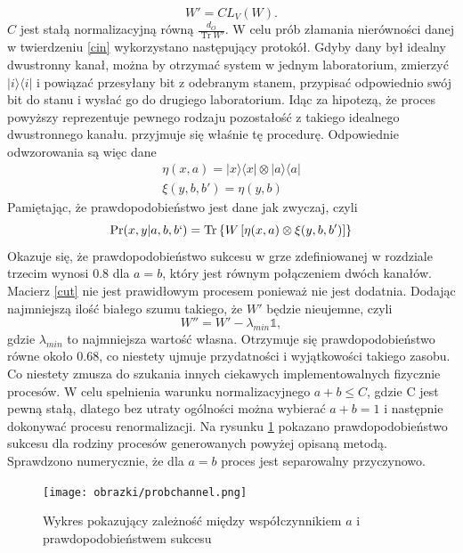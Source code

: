 \documentclass[10pt]{article} %
\DeclareMathOperator{\Trs}{Tr}
\newcommand{\Ket}[1]{|#1\rangle}
\newcommand{\Bra}[1]{\langle#1|}
\newcommand{\I}{\mathbb{1}}
\begin{document}
\begin{equation}
\label{cut}
W' = CL_V(W).
\end{equation}
$C$ jest stałą normalizacyjną równą $\frac{d_O}{\Trs W'}$.
W celu prób złamania nierówności danej w twierdzeniu \ref{cin} wykorzystano następujący protokół. Gdyby dany był idealny dwustronny kanał, można by otrzymać system w jednym laboratorium, zmierzyć $\Ket{i}\Bra{i}$ i powiązać przesyłany bit z odebranym stanem, przypisać odpowiednio swój bit do stanu i wysłać go do drugiego laboratorium. Idąc za hipotezą, że proces powyższy reprezentuje pewnego rodzaju pozostałość z takiego idealnego dwustronnego kanału. przyjmuje się właśnie tę procedurę. Odpowiednie odwzorowania są więc dane
\begin{gather}
\eta(x,a) = \Ket{x}\Bra{x} \otimes \Ket{a}\Bra{a} \\
\xi(y,b,b') = \eta(y,b)
\end{gather}
Pamiętając, że prawdopodobieństwo jest dane jak zwyczaj, czyli
\begin{equation}
\Pr(x,y|a,b,b`) = \Trs\left\{{W\left[\eta(x,a) \otimes \xi(y,b,b') \right]}\right\}
\end{equation}
Okazuje się, że prawdopodobieństwo sukcesu w grze zdefiniowanej w rozdziale trzecim wynosi $0.8$ dla $a=b$, który jest równym połączeniem dwóch kanałów.
Macierz \eqref{cut} nie jest prawidłowym procesem ponieważ nie jest dodatnia. Dodając najmniejszą ilość białego szumu takiego, że $W'$ będzie nieujemne, czyli
\begin{equation}
W'' = W' - \lambda_{min} \I,
\end{equation} gdzie $\lambda_{min}$ to najmniejsza wartość własna.
Otrzymuje się prawdopodobieństwo równe około $0.68$, co niestety ujmuje przydatności i wyjątkowości takiego zasobu. Co niestety zmusza do szukania innych ciekawych implementowalnych fizycznie procesów.
W celu spelnienia warunku normalizacyjnego $a + b \leq C$, gdzie C jest pewną stałą, dlatego bez utraty ogólności można wybierać $a + b = 1$ i następnie dokonywać procesu renormalizacji. Na rysunku \ref{fig:bichannel} pokazano prawdopodobieństwo sukcesu dla rodziny procesów generowanych powyżej opisaną metodą. Sprawdzono numerycznie, że dla $a = b$ proces jest separowalny przyczynowo.
\begin{figure}[t]
\centering
\texttt{[image: obrazki/probchannel.png]}
\caption{Wykres pokazujący zależność między współczynnikiem $a$ i prawdopodobieństwem sukcesu}
\label{fig:bichannel}
\end{figure}
\end{document}
